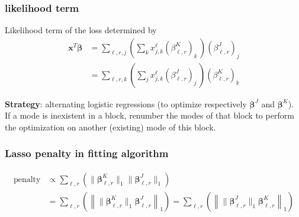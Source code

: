 \documentclass{beamer}
\begin{document}
\begin{frame}
\frametitle{likelihood term}
Likelihood term of the loss determined by
\begin{align}
\mathbf{x}^T\bm{\beta} &=  \sum\limits_{\ell,r,j} \left(\sum\limits_{k}  x_{j,k}^\ell(\beta_{\ell,r}^{K})_k \, \right)(\beta_{\ell,r}^{J})_j\\
&= \sum\limits_{\ell,r,k} \left(\sum\limits_{j}  x_{j,k}^\ell(\beta_{\ell,r}^{J})_j \, \right)(\beta_{\ell,r}^{K})_k
\end{align}

\textbf{Strategy}: alternating logistic regressions (to optimize respectively $\bm{\beta}^J$ and $\bm{\beta}^K$).\\[5 pt]

If a mode is inexistent in a block, renumber the modes of that block to perform the optimization on another (existing) mode of this block.

\end{frame}

\begin{frame}
    \frametitle{Lasso penalty in fitting algorithm}

    \begin{align}
        \text{penalty} &\propto \sum\limits_{\ell,r} \left( \lVert \bm{\beta}_{\ell,r}^K \rVert_1 \lVert \bm{\beta}_{\ell,r}^J \rVert_1 \right)\\
        &= \sum\limits_{\ell,r} \left( \left\lVert  \lVert\bm{\beta}_{\ell,r}^K \rVert_1  \bm{\beta}_{\ell,r}^J \right\rVert_1 \right)  = \sum\limits_{\ell,r} \left( \left\lVert  \lVert\bm{\beta}_{\ell,r}^J \rVert_1  \bm{\beta}_{\ell,r}^K \right\rVert_1  \right)
    \end{align}

\end{frame}
\end{document}
